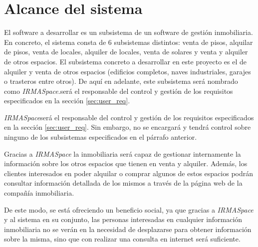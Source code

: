 \section{Alcance del sistema}\label{sec:scope}
\par El software a desarrollar es un subsistema de un software de gestión inmobiliaria. En concreto, el sistema consta de 6 subsistemas distintos: venta de pisos, alquilar de pisos, venta de locales, alquiler de locales, venta de solares y venta y alquiler de otros espacios. El subsistema concreto a desarrollar en este proyecto es el de alquiler y venta de otros espacios (edificios completos, naves industriales, garajes o trasteros entre otros). De aquí en adelante, este subsistema será nombrado como \textit{IRMASpace}.será el responsable del control y gestión de los requisitos especificados en la sección \ref{sec:user_req}.

\par \textit{IRMASpace}será el responsable del control y gestión de los requisitos especificados en la sección \ref{sec:user_req}. Sin embargo, no se encargará y tendrá control sobre ninguno de los subsistemas especificados en el párrafo anterior.

\par Gracias a \textit{IRMASpace} la inmobiliaria será capaz de gestionar internamente la información sobre los otros espacios que tienen en venta y alquiler. Además, los clientes interesados en poder alquilar o comprar algunos de estos espacios podrán consultar información detallada de los mismos a través de la página web de la compañía inmobiliaria.

\par De este modo, se está ofreciendo un beneficio social, ya que gracias a \textit{IRMASpace} y al sistema en su conjunto, las personas interesadas en cualquier información inmobiliaria no se verán en la necesidad de desplazarse para obtener información sobre la misma, sino que con realizar una consulta en internet será suficiente.
